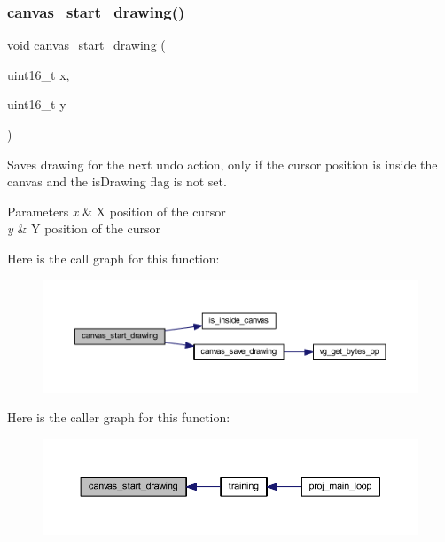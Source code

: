 \subsubsection{\texorpdfstring{canvas\+\_\+start\+\_\+drawing()}{canvas\_start\_drawing()}}
{\footnotesize\ttfamily void canvas\+\_\+start\+\_\+drawing (\begin{DoxyParamCaption}\item[{uint16\+\_\+t}]{x,  }\item[{uint16\+\_\+t}]{y }\end{DoxyParamCaption})}



Saves drawing for the next undo action, only if the cursor position is inside the canvas and the is\+Drawing flag is not set. 


\begin{DoxyParams}{Parameters}
{\em x} & X position of the cursor \\
\hline
{\em y} & Y position of the cursor \\
\hline
\end{DoxyParams}
Here is the call graph for this function\+:\nopagebreak
\begin{figure}[H]
\begin{center}
\leavevmode
\includegraphics[width=350pt]{group__canvas_ga3a6a181542db6b70c3aadc411073943d_cgraph}
\end{center}
\end{figure}
Here is the caller graph for this function\+:\nopagebreak
\begin{figure}[H]
\begin{center}
\leavevmode
\includegraphics[width=350pt]{group__canvas_ga3a6a181542db6b70c3aadc411073943d_icgraph}
\end{center}
\end{figure}
\mbox{\label{group__canvas_ga95994c1c125e70ef4d9380e80ed9c3ab}} 
